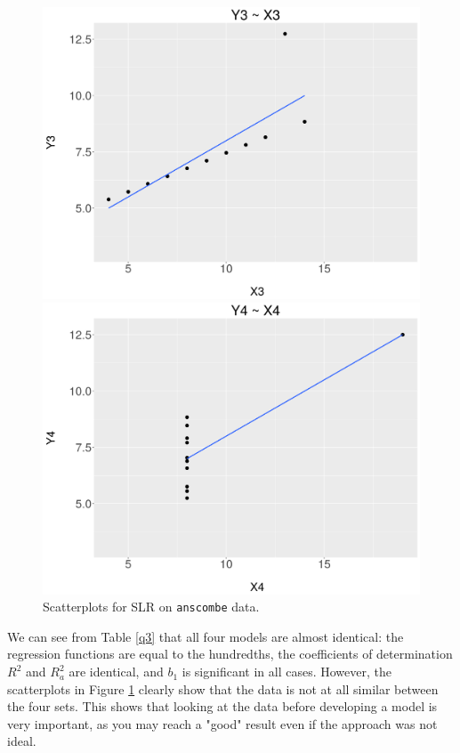 \documentclass[]{article}
\begin{document}
\begin{figure}[!ht]
\begin{minipage}[b]{0.5\linewidth}
    \centering
    \includegraphics[width=\linewidth]{q3-3.png} 
    \vspace{2ex}
  \end{minipage}%
  \begin{minipage}[b]{0.5\linewidth}
    \centering
    \includegraphics[width=\linewidth]{q3-4.png} 
    \vspace{2ex}
  \end{minipage}
  \caption{Scatterplots for SLR on \texttt{anscombe} data.}
  \label{fig3} 
\end{figure}

We can see from Table \ref{q3} that all four models are almost identical: the regression functions are equal to the hundredths, the coefficients of determination $R^2$ and $R^2_a$ are identical, and $b_1$ is significant in all cases. However, the scatterplots in Figure \ref{fig3} clearly show that the data is not at all similar between the four sets. This shows that looking at the data before developing a model is very important, as you may reach a "good" result even if the approach was not ideal.
\end{document}
